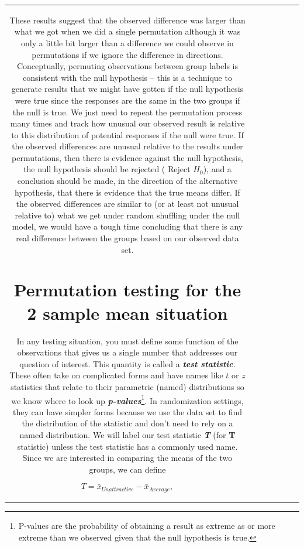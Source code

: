 \documentclass[]{book}
\let\rmarkdownfootnote\footnote%
\def\footnote{\protect\rmarkdownfootnote}
\theoremstyle{definition}
\theoremstyle{definition}
\theoremstyle{remark}
\begin{document}
\begin{longtable}[]{@{}ccccccc@{}}
\begin{minipage}[b]{0.10\columnwidth}
These results suggest that the observed difference was larger than what
we got when we did a single permutation although it was only a little
bit larger than a difference we could observe in permutations if we
ignore the difference in directions. Conceptually, permuting
observations between group labels is consistent with the null hypothesis
-- this is a technique to generate results that we might have gotten if
the null hypothesis were true since the responses are the same in the
two groups if the null is true. We just need to repeat the permutation
process many times and track how unusual our observed result is relative
to this distribution of potential responses if the null were true. If
the observed differences are unusual relative to the results under
permutations, then there is evidence against the null hypothesis, the
null hypothesis should be rejected ( Reject \(H_0\)), and a conclusion
should be made, in the direction of the alternative hypothesis, that
there is evidence that the true means differ. If the observed
differences are similar to (or at least not unusual relative to) what we
get under random shuffling under the null model, we would have a tough
time concluding that there is any real difference between the groups
based on our observed data set.

\section{Permutation testing for the 2 sample mean
situation}\label{section2-4}

In any testing situation, you must define some function of the
observations that gives us a single number that addresses our question
of interest. This quantity is called a \textbf{\emph{test statistic}}.
These often take on complicated forms and have names like \(t\) or \(z\)
statistics that relate to their parametric (named) distributions so we
know where to look up \textbf{\emph{p-values}}\footnote{P-values are the
  probability of obtaining a result as extreme as or more extreme than
  we observed given that the null hypothesis is true.}. In randomization
settings, they can have simpler forms because we use the data set to
find the distribution of the statistic and don't need to rely on a named
distribution. We will label our test statistic \textbf{\emph{T}} (for
\textbf{T} statistic) unless the test statistic has a commonly used
name. Since we are interested in comparing the means of the two groups,
we can define

\[T=\bar{x}_{Unattractive}-\bar{x}_{Average},\]


\end{minipage}
\end{longtable}
\end{document}
